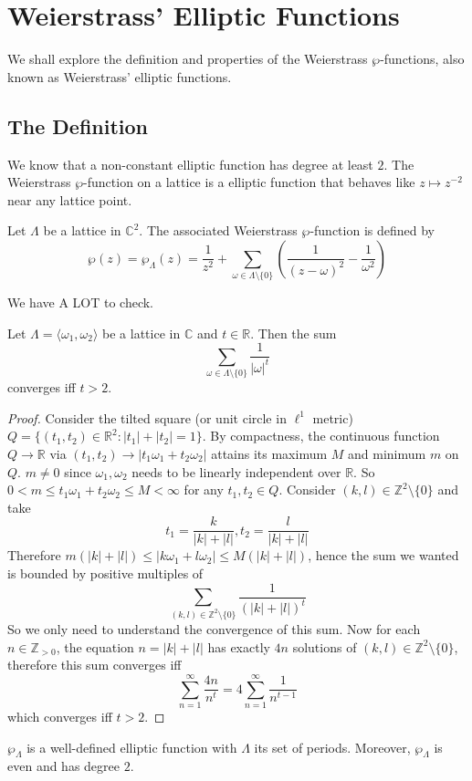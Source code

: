 \section{Weierstrass' Elliptic Functions}
We shall explore the definition and properties of the Weierstrass $\wp$-functions, also known as Weierstrass' elliptic functions.
\subsection{The Definition}
We know that a non-constant elliptic function has degree at least $2$.
The Weierstrass $\wp$-function on a lattice is a elliptic function that behaves like $z\mapsto z^{-2}$ near any lattice point.
\begin{definition}
    Let $\Lambda$ be a lattice in $\mathbb C^2$.
    The associated Weierstrass $\wp$-function is defined by
    $$\wp(z)=\wp_\Lambda(z)=\frac{1}{z^2}+\sum_{\omega\in\Lambda\setminus\{0\}}\left(\frac{1}{(z-\omega)^2}-\frac{1}{\omega^2}\right)$$
\end{definition}
We have A LOT to check.
\begin{lemma}
    Let $\Lambda=\langle\omega_1,\omega_2\rangle$ be a lattice in $\mathbb C$ and $t\in\mathbb R$.
    Then the sum
    $$\sum_{\omega\in\Lambda\setminus\{0\}}\frac{1}{|\omega|^t}$$
    converges iff $t>2$.
\end{lemma}
\begin{proof}
    Consider the tilted square (or unit circle in $\ell^1$ metric) $Q=\{(t_1,t_2)\in\mathbb R^2:|t_1|+|t_2|=1\}$.
    By compactness, the continuous function $Q\to\mathbb R$ via $(t_1,t_2)\to|t_1\omega_1+t_2\omega_2|$ attains its maximum $M$ and minimum $m$ on $Q$.
    $m\neq 0$ since $\omega_1,\omega_2$ needs to be linearly independent over $\mathbb R$.
    So $0<m\le t_1\omega_1+t_2\omega_2\le M<\infty$ for any $t_1,t_2\in Q$.
    Consider $(k,l)\in\mathbb Z^2\setminus\{0\}$ and take
    $$t_1=\frac{k}{|k|+|l|},t_2=\frac{l}{|k|+|l|}$$
    Therefore $m(|k|+|l|)\le |k\omega_1+l\omega_2|\le M(|k|+|l|)$, hence the sum we wanted is bounded by positive multiples of
    $$\sum_{(k,l)\in\mathbb Z^2\setminus\{0\}}\frac{1}{(|k|+|l|)^t}$$
    So we only need to understand the convergence of this sum.
    Now for each $n\in\mathbb Z_{>0}$, the equation $n=|k|+|l|$ has exactly $4n$ solutions of $(k,l)\in\mathbb Z^2\setminus\{0\}$, therefore this sum converges iff
    $$\sum_{n=1}^\infty\frac{4n}{n^t}=4\sum_{n=1}^\infty\frac{1}{n^{t-1}}$$
    which converges iff $t>2$.
\end{proof}
\begin{theorem}
    $\wp_\Lambda$ is a well-defined elliptic function with $\Lambda$ its set of periods.
    Moreover, $\wp_\Lambda$ is even and has degree $2$.
\end{theorem}
